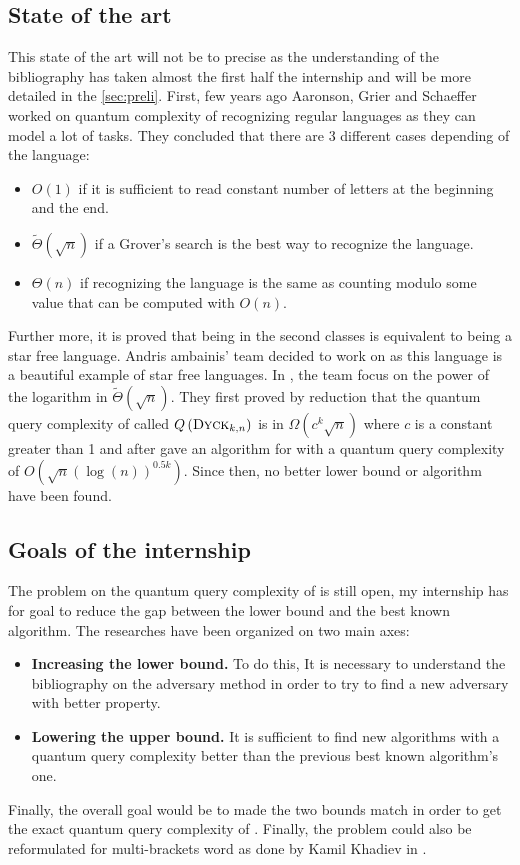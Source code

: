 \subsection{State of the art}
This state of the art will not be to precise as the understanding of the
bibliography has taken almost the first half the internship and will be
more detailed in the \autoref{sec:preli}. First, few years ago Aaronson,
Grier and Schaeffer \cite[2019]{trichotomy_not_andris} worked on quantum complexity
of recognizing regular languages as they can model a lot of tasks. They
concluded that there are 3 different cases depending of the language:
\begin{itemize}
    \item $O(1)$ if it is sufficient to read constant number of letters at the beginning and the end.
    \item $\tilde{\Theta}(\sqrt{n})$ if a Grover's search is the best way to recognize the language.
    \item $\Theta(n)$ if recognizing the language is the same as counting modulo some value that can
          be computed with $O(n)$.
\end{itemize}
Further more, it is proved that being in the second classes is equivalent to
being a star free language. Andris ambainis' team decided to work on  as this
language is a beautiful example of star free languages. In \cite[2020]{art:2DGrid},
the team focus on the power of the logarithm in $\tilde{\Theta}\left(\sqrt{n}\right)$.
They first proved by reduction that the quantum query complexity of 
called $Q\left(\textsc{Dyck$_{k, n}$}\right)$ is in $\Omega\left(c^k\sqrt{n}\right)$ where $c$ is
a constant greater than 1 and after gave an algorithm for  with a quantum
query complexity of $O\left(\sqrt{n}(\log(n))^{0.5k}\right)$. Since then, no better
lower bound or algorithm have been found.

\subsection{Goals of the internship}
The problem on the quantum query complexity of  is still open, my internship
has for goal to reduce the gap between the lower bound and the best known algorithm.
The researches have been organized on two main axes:
\begin{itemize}
    \item \textbf{Increasing the lower bound.} To do this, It is necessary to understand the bibliography
          on the adversary method in order to try to find a new adversary with better property.
    \item \textbf{Lowering the upper bound.} It is sufficient to find new algorithms
          with a quantum query complexity better than  the previous best known algorithm's one.
\end{itemize}
Finally, the overall goal would be to made the two bounds match in order to get the exact quantum
query complexity of . Finally, the problem could also be reformulated for multi-brackets word
as done by Kamil Khadiev in \cite{DBLP:conf/uc/KhadievK21}.

